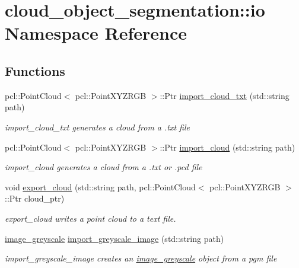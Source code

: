 \hypertarget{namespacecloud__object__segmentation_1_1io}{}\section{cloud\+\_\+object\+\_\+segmentation\+:\+:io Namespace Reference}
\label{namespacecloud__object__segmentation_1_1io}
\subsection*{Functions}
\begin{DoxyCompactItemize}
\item 
pcl\+::\+Point\+Cloud$<$ pcl\+::\+Point\+X\+Y\+Z\+R\+GB $>$\+::Ptr \hyperlink{namespacecloud__object__segmentation_1_1io_ac8f0980f5045c87e877ab60f0795f9cf}{import\+\_\+cloud\+\_\+txt} (std\+::string path)
\begin{DoxyCompactList}\small\item\em import\+\_\+cloud\+\_\+txt generates a cloud from a .txt file \end{DoxyCompactList}\item 
pcl\+::\+Point\+Cloud$<$ pcl\+::\+Point\+X\+Y\+Z\+R\+GB $>$\+::Ptr \hyperlink{namespacecloud__object__segmentation_1_1io_aaf87f524c221a2222f755d49bb4d5b1b}{import\+\_\+cloud} (std\+::string path)
\begin{DoxyCompactList}\small\item\em import\+\_\+cloud generates a cloud from a .txt or .pcd file \end{DoxyCompactList}\item 
void \hyperlink{namespacecloud__object__segmentation_1_1io_aa0ffa6a4280c9454f62cb96566358f1b}{export\+\_\+cloud} (std\+::string path, pcl\+::\+Point\+Cloud$<$ pcl\+::\+Point\+X\+Y\+Z\+R\+GB $>$\+::Ptr cloud\+\_\+ptr)
\begin{DoxyCompactList}\small\item\em export\+\_\+cloud writes a point cloud to a text file. \end{DoxyCompactList}\item 
\hyperlink{classcloud__object__segmentation_1_1image__greyscale}{image\+\_\+greyscale} \hyperlink{namespacecloud__object__segmentation_1_1io_af166fac778d63a5b2142d140a96092f8}{import\+\_\+greyscale\+\_\+image} (std\+::string path)
\begin{DoxyCompactList}\small\item\em import\+\_\+greyscale\+\_\+image creates an \hyperlink{classcloud__object__segmentation_1_1image__greyscale}{image\+\_\+greyscale} object from a pgm file \end{DoxyCompactList}\item 

\end{DoxyCompactItemize}
